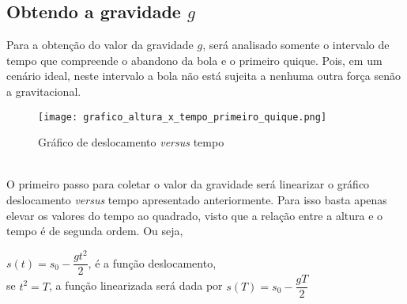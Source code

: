 \documentclass[a4paper, 12pt]{article}
\begin{document}
		\subsection{Obtendo a gravidade $g$}
		Para a obtenção do valor da gravidade $g$, será analisado somente o intervalo de tempo que compreende o abandono da bola e o primeiro quique. Pois, em um cenário ideal, neste intervalo a bola não está sujeita a nenhuma outra força senão a gravitacional.
		\begin{figure}[htb]
			\centering
			\texttt{[image: grafico\_altura\_x\_tempo\_primeiro\_quique.png]}
			\caption{Gráfico de deslocamento \textsl{versus} tempo}
			\label{g1}
		\end{figure} \\
		\newpage		
		\noindent O primeiro passo para coletar o valor da gravidade será linearizar o gráfico deslocamento \textsl{versus} tempo apresentado anteriormente. Para isso basta apenas elevar os valores do tempo ao quadrado, visto que a relação entre a altura e o tempo é de segunda ordem. Ou seja, \\
		\begin{center}
		$s(t) = s_0-\dfrac{gt^2}{2}$, é a função deslocamento, \\
		se $t^2=T$, a função linearizada será dada por $s(T) = s_0-\dfrac{gT}{2}$
		\end{center}
		
\end{document}

